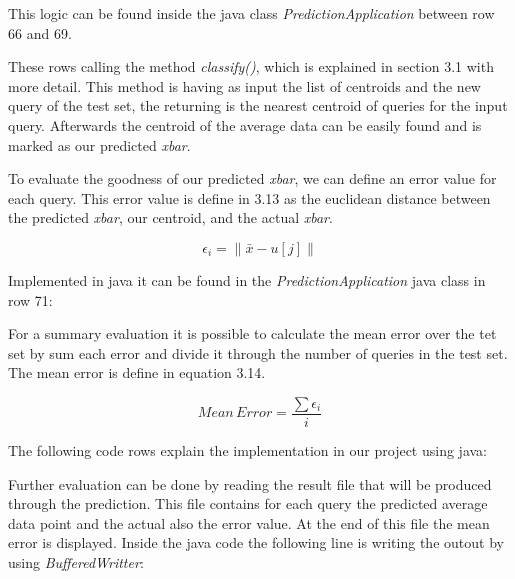 \documentclass{lmproj}
\begin{document}
This logic can be found inside the java class \textit{PredictionApplication} between row 66 and 69. 


These rows calling the method \textit{classify()}, which is explained in section 3.1 with more detail. This method is having as input the list of centroids and the new query of the test set, the returning is the nearest centroid of queries for the input query. Afterwards the centroid of the average data can be easily found and is marked as our predicted \textit{xbar}.

To evaluate the goodness of our predicted \textit{xbar}, we can define an error value for each query. This error value is define in 3.13 as the euclidean distance between the predicted \textit{xbar}, our centroid, and the actual \textit{xbar}.

\begin{equation}
	\epsilon_i = \parallel \bar{x} - u[j] \parallel 
\end{equation}

Implemented in java it can be found in the \textit{PredictionApplication} java class in row 71:



For a summary evaluation it is possible to calculate the mean error over the tet set by sum each error and divide it through the number of queries in the test set. The mean error is define in equation 3.14.

\begin{equation}
Mean\,Error= \frac{\sum\epsilon_i}{i}
\end{equation}

The following code rows explain the implementation in our project using java:



Further evaluation can be done by reading the result file that will be produced through the prediction. This file contains for each query the predicted average data point and the actual also the error value. At the end of this file the mean error is displayed. Inside the java code the following line is writing the outout by using \textit{BufferedWritter}:


\end{document}

